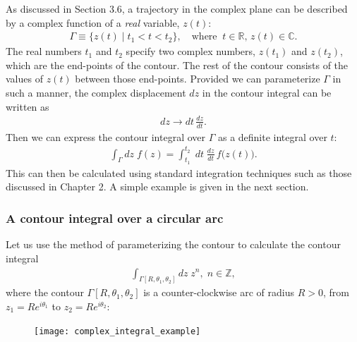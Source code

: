 \documentclass[10pt,a4paper]{article}
\begin{document}
As discussed in Section 3.6, a trajectory in the complex plane can be
described by a complex function of a \textit{real} variable, $z(t)$:
\begin{align}
  \Gamma \equiv \Big\{z(t) \;\Big|\; t_1 < t < t_2\Big\}, \quad \mathrm{where}\;\; t \in \mathbb{R}, \,z(t) \in \mathbb{C}.
\end{align}
The real numbers $t_1$ and $t_2$ specify two complex numbers, $z(t_1)$
and $z(t_2)$, which are the end-points of the contour. The rest of the
contour consists of the values of $z(t)$ between those
end-points. Provided we can parameterize $\Gamma$ in such a manner,
the complex displacement $dz$ in the contour integral can be written
as
\begin{align}
  dz \rightarrow dt\, \frac{dz}{dt}.
\end{align}
Then we can express the contour integral over $\Gamma$ as a definite
integral over $t$:
\begin{align}
  \int_\Gamma dz\; f(z) = \int_{t_1}^{t_2} \; dt\; \frac{dz}{dt}\, f\big(z(t)\big).
\end{align}
This can then be calculated using standard integration techniques such
as those discussed in Chapter 2. A simple example is given in the next
section.

\subsubsection{A contour integral over a circular arc}
\label{arc-contour}

Let us use the method of parameterizing the contour to calculate the
contour integral
\begin{align}
  \int_{\Gamma[R, \theta_1,\theta_2]} dz\; z^n,\; n\in\mathbb{Z},
\end{align}
where the contour $\Gamma[R, \theta_1,\theta_2]$ is a
counter-clockwise arc of radius $R > 0$, from $z_1 = R e^{i\theta_1}$
to $z_2 = R e^{i\theta_2}$:

\begin{figure}[H]
  \centering\texttt{[image: complex\_integral\_example]}
\end{figure}
\end{document}
